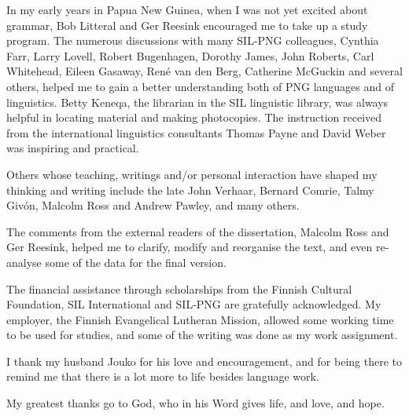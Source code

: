 In my early years in Papua New Guinea, when I was not yet excited about grammar,  Bob Litteral and Ger Reesink encouraged me to take up a study program. The numerous discussions with many SIL-PNG colleagues, Cynthia Farr, Larry Lovell, Robert Bugenhagen, Dorothy James, John Roberts, Carl Whitehead, Eileen Gasaway, Ren\'e van den Berg, Catherine McGuckin and several others, helped me to gain a better understanding both of  PNG languages and of linguistics. Betty Keneqa, the librarian in the SIL linguistic library, was always helpful in locating material and making photocopies. The instruction received from the international linguistics consultants Thomas Payne and David Weber was inspiring and practical.

Others whose teaching, writings and/or personal interaction have shaped my thinking and writing include the late John Verhaar, Bernard Comrie, Talmy Giv\'on, Malcolm Ross and Andrew Pawley, and many others.  

The comments from the external readers of the dissertation, Malcolm Ross and Ger Reesink, helped me to clarify, modify and reorganise the text, and even re-analyse some of the data for the final version.

The financial assistance through scholarships from the Finnish Cultural Foundation, SIL International and SIL-PNG are gratefully acknowledged. My employer, the Finnish Evangelical Lutheran Mission, allowed some working time to be used for studies, and some of the writing was done as my work assignment. 

I thank my husband Jouko for his love and encouragement, and for being there to remind me that there is a lot more to life besides language work.

My greatest thanks go to God, who in his Word gives life, and love, and hope. 



